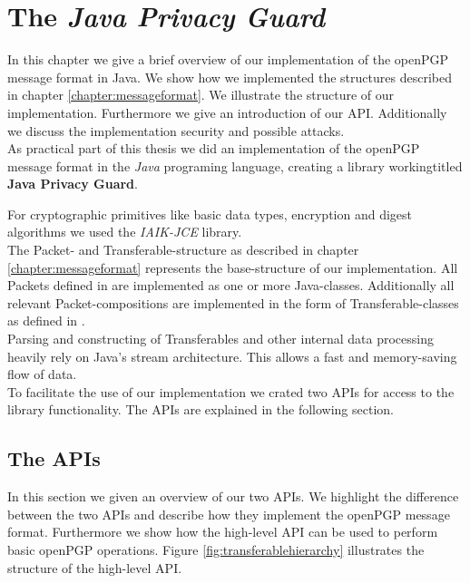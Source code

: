 \chapter{The \textit{Java Privacy Guard}} \label{chapter:jpg}

In this chapter we give a brief overview of our implementation of the openPGP message format in Java. We show how we implemented the structures described in chapter \ref{chapter:messageformat}. We illustrate the structure of our implementation. Furthermore we give an introduction of our API.
Additionally we discuss the implementation security and possible attacks.  \\


As practical part of this thesis we did an implementation of the openPGP message format  in the \textit{Java} programing language, creating a library workingtitled \textbf{Java Privacy Guard}.

For cryptographic primitives like basic data types, encryption and digest algorithms we used the \textit{IAIK-JCE} library. \\

The Packet- and Transferable-structure as described in chapter \ref{chapter:messageformat} represents the base-structure of our implementation. All Packets defined in  are implemented as one or more Java-classes. Additionally all relevant Packet-compositions are implemented in the form of Transferable-classes as defined in . \\

Parsing and constructing of Transferables and other internal data processing heavily rely on Java's stream architecture. This allows a fast and memory-saving flow of data. \\

To facilitate the use of our implementation we crated two APIs for access to the library functionality. The APIs are explained in the following section.

\section{The APIs}

In this section we given an overview of our two APIs. We highlight the difference between the two APIs and describe how they implement the openPGP message format. Furthermore we show how the high-level API can be used to perform basic openPGP operations. Figure \ref{fig:transferablehierarchy} illustrates the structure of the high-level API. \\

